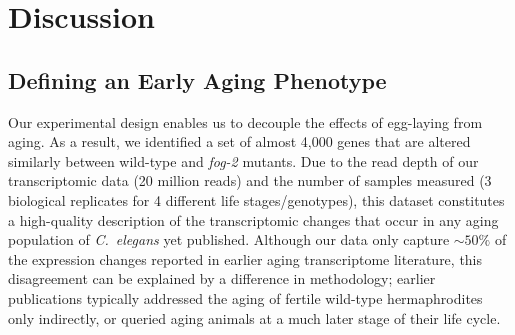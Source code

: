 \documentclass[10pt,letterpaper,twocolumn]{article}
\newcommand{\cel}{\emph{C.~elegans}}
\newcommand{\fog}{\emph{\mbox{fog-2}}}
\begin{document}
%
%
%

\section*{Discussion}
\label{sec:discussion}

\subsection*{Defining an Early Aging Phenotype}
\label{sub:Defining an Early Aging Phenotype}

Our experimental design enables us to decouple the effects of egg-laying from aging. As a result, we identified a set of almost 4,000 genes that are altered similarly between wild-type and \fog{} mutants. Due to the read depth of our transcriptomic data (20 million reads) and the number of samples measured (3 biological replicates for 4 different life stages/genotypes), this dataset constitutes a high-quality description of the transcriptomic changes that occur in any aging population of \cel{} yet published.
Although our data only capture $\sim50\%$ of the expression changes reported in earlier aging transcriptome literature, this disagreement can be explained by a difference in methodology; earlier publications typically addressed the aging of fertile wild-type hermaphrodites only indirectly, or queried aging animals at a much later stage of their life cycle.
\end{document}
